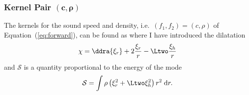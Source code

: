 \subsubsection*{Kernel Pair \texorpdfstring{$\mathbf{(c, \rho)}$}{(c,rho)}}
\noindent
The kernels for the sound speed and density, i.e.\ ${(f_1, f_2) = (c, \rho)}$ of Equation~(\ref{eq:forward}), can be found as \citep[\emph{cf.}][]{GoughThompson1991}
where %
I have introduced the dilatation
\begin{equation}
    \chi = \ddra{\xi_r} + 2\frac{\xi_r}{r} - \Ltwo \frac{\xi_h}{r}
\end{equation}
and $\mathcal{S}$ is a quantity proportional to the energy of the mode
\begin{equation}
    \mathcal{S} = \int \rho \left( \xi_r^2 + \Ltwo \xi_h^2 \right) r^2 \; \text{d}r. 
\end{equation}



